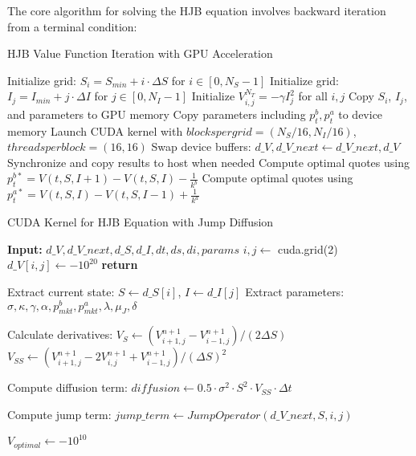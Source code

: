 \documentclass[twocolumn,11pt]{IEEEtran}  %
\begin{document}
\begin{onecolumn}
\begin{onecolumn}
The core algorithm for solving the HJB equation involves backward iteration from a terminal condition:


\begin{algorithm}
\caption{HJB Value Function Iteration with GPU Acceleration}
\begin{algorithmic}[1]
\State Initialize grid: $S_i = S_{min} + i \cdot \Delta S$ for $i \in [0, N_S-1]$
\State Initialize grid: $I_j = I_{min} + j \cdot \Delta I$ for $j \in [0, N_I-1]$
\State Initialize $V^{N_T}_{i,j} = -\gamma I_j^2$ for all $i,j$
\State Copy $S_i$, $I_j$, and parameters to GPU memory
    \State Copy parameters including $p^b_t, p^a_t$ to device memory
    \State Launch CUDA kernel with $blockspergrid=(N_S/16, N_I/16)$, $threadsperblock=(16, 16)$
    \State Swap device buffers: $d\_V, d\_V\_next \gets d\_V\_next, d\_V$
    \State Synchronize and copy results to host when needed
\EndFor
\State Compute optimal quotes using $p^{b*}_t = V(t,S,I+1) - V(t,S,I) - \frac{1}{k^b}$
\State Compute optimal quotes using $p^{a*}_t = V(t,S,I) - V(t,S,I-1) + \frac{1}{k^a}$
\end{algorithmic}
\end{algorithm}


\begin{algorithm}
\caption{CUDA Kernel for HJB Equation with Jump Diffusion}
\begin{algorithmic}[1]
\State \textbf{Input:} $d\_V, d\_V\_next, d\_S, d\_I, dt, ds, di, params$
\State $i, j \gets$ cuda.grid(2)
        \State $d\_V[i,j] \gets -10^{20}$ 
        \State \textbf{return}
    \EndIf
    
    \State Extract current state: $S \gets d\_S[i]$, $I \gets d\_I[j]$
    \State Extract parameters: $\sigma, \kappa, \gamma, \alpha, p^b_{mkt}, p^a_{mkt}, \lambda, \mu_J, \delta$
    
    \State Calculate derivatives:
    \State $V_S \gets (V^{n+1}_{i+1,j} - V^{n+1}_{i-1,j})/(2\Delta S)$
    \State $V_{SS} \gets (V^{n+1}_{i+1,j} - 2V^{n+1}_{i,j} + V^{n+1}_{i-1,j})/(\Delta S)^2$
    
    \State Compute diffusion term: $diffusion \gets 0.5 \cdot \sigma^2 \cdot S^2 \cdot V_{SS} \cdot \Delta t$
    
    \State Compute jump term: $jump\_term \gets JumpOperator(d\_V\_next, S, i, j)$
    
    \State $V_{optimal} \gets -10^{10}$ 
    

\end{algorithmic}
\end{algorithm}
\end{onecolumn}
\end{onecolumn}
\end{document}
